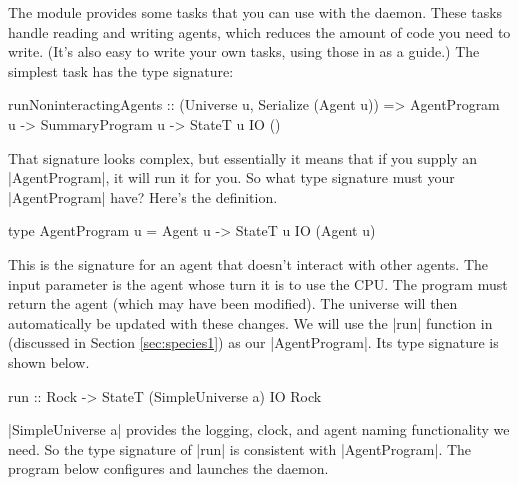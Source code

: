 
The module  provides some tasks
that you can use with the daemon.
These tasks handle reading and writing agents,
which reduces the amount of code you need to write.
(It's also easy to write your own tasks, using those in 
 as a guide.)
The simplest task has the type signature:

\begin{code}
runNoninteractingAgents
  :: (Universe u, Serialize (Agent u))
    => AgentProgram u -> SummaryProgram u -> StateT u IO ()
\end{code}

That signature looks complex, but essentially it means that if you
supply an |AgentProgram|, it will run it for you.
So what type signature must your |AgentProgram| have?
Here's the definition.

\begin{code}
type AgentProgram u = Agent u -> StateT u IO (Agent u)
\end{code}

This is the signature for an agent that doesn't interact with other
agents.
The input parameter is the agent whose turn it is to use the CPU.
The program must return the agent (which may have been modified).
The universe will then automatically be updated with these changes.
We will use the |run| function in 
(discussed in Section \ref{sec:species1}) as our |AgentProgram|.
Its type signature is shown below.

\begin{code}
run :: Rock -> StateT (SimpleUniverse a) IO Rock
\end{code}

|SimpleUniverse a| provides the logging, clock, and agent naming
functionality we need.
So the type signature of |run| is consistent with |AgentProgram|.
The program below configures and launches the daemon.


